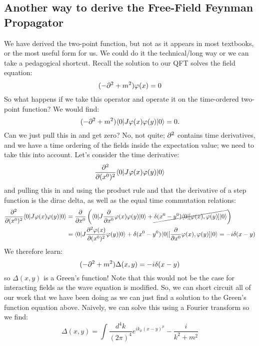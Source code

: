 \subsection{Another way to derive the Free-Field Feynman Propagator}
We have derived the two-point function, but not as it appears in most textbooks, or the most useful form for us. We could do it the technical/long way or we can take a pedagogical shortcut. Recall the solution to our QFT solves the field equation:
\begin{equation}
    (-\p^2 + m^2)\varphi(x) = 0
\end{equation}
So what happens if we take this operator and operate it on the time-ordered two-point function? We would find:
\begin{equation}
    (-\p^2 + m^2)\bra{0}J\varphi(x)\varphi(y)\ket{0} = 0.
\end{equation}
Can we just pull this in and get zero? No, not quite; $\partial^2$ contains time derivatives, and we have a time ordering of the fields inside the expectation value; we need to take this into account. Let's consider the time derivative:
\begin{equation}
    \dpd{^2}{(x^0)^2}\bra{0}J\varphi(x)\varphi(y)\ket{0}
\end{equation}
and pulling this in and using the product rule and that the derivative of a step function is the dirac delta, as well as the equal time commutation relations:
\begin{equation}
    \begin{split}
        \dpd{^2}{(x^0)^2}\bra{0}J\varphi(x)\varphi(y)\ket{0} &= \dpd{}{x^0}\left(\bra{0}J\dpd{}{x^0}\varphi(x)\varphi(y)\ket{0} + \cancel{\delta(x^0 - y^0)\bra{0}[\varphi(x), \varphi(y)]\ket{0}}\right)
        \\ &= \bra{0}J\dpd{^2\varphi(x)}{(x^0)^2}\varphi(y)\ket{0} + \delta(x^0 - y^0)\bra{0}[\dpd{}{x^0}\varphi(x), \varphi(y)]\ket{0} = -i\delta(x - y)
    \end{split}
\end{equation}
We therefore learn:
\begin{equation}
    (-\partial^2 + m^2)\Delta(x, y) = -i\delta(x - y)
\end{equation}
so $\Delta(x, y)$ is a Green's function! Note that this would not be the case for interacting fields as the wave equation is modified. So, we can short circuit all of our work that we have been doing as we can just find a solution to the Green's function equation above. Naively, we can solve this using a Fourier transform so we find:
\begin{equation}
    \Delta(x, y) = \int \frac{d^4k}{(2\pi)^4}e^{ik_\mu(x - y)^\mu} - \frac{i}{k^2 + m^2} 
\end{equation}
